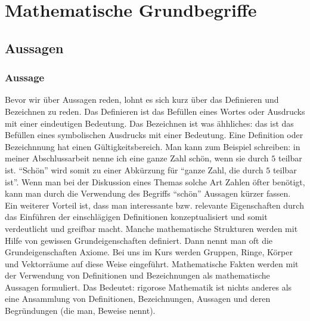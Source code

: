 \section{Mathematische Grundbegriffe}



\subsection{Aussagen}

\subsubsection{Aussage}

Bevor wir über Aussagen reden, lohnt es sich kurz über das Definieren und Bezeichnen zu reden. Das Definieren ist das Befüllen eines Wortes oder Ausdrucks mit einer eindeutigen Bedeutung. Das Bezeichnen ist was ähhliches: das ist das Befüllen eines symbolischen Ausdrucks mit einer Bedeutung. 
 Eine Definition oder Bezeichnnung hat einen Gültigkeitsbereich. Man kann zum Beispiel schreiben: in meiner Abschlussarbeit nenne ich eine ganze Zahl schön, wenn sie durch $5$ teilbar ist. ``Schön'' wird somit zu  einer Abkürzung für ``ganze Zahl, die durch $5$ teilbar ist''. Wenn man bei der Diskussion eines Themas solche Art Zahlen öfter benötigt, kann man durch die Verwendung des Begriffs ``schön'' Aussagen kürzer fassen. Ein weiterer Vorteil ist, dass man interessante bzw. relevante Eigenschaften durch das Einführen der einschlägigen Definitionen konzeptualisiert und somit verdeutlicht und greifbar macht. Manche mathematische Strukturen werden mit Hilfe von gewissen Grundeigenschaften definiert. Dann nennt man oft die Grundeigenschaften Axiome. Bei uns im Kurs werden Gruppen, Ringe, Körper und Vektorräume auf diese Weise eingeführt. Mathematische Fakten werden mit der Verwendung von Definitionen und Bezeichnungen als mathematische Aussagen formuliert. Das Bedeutet: rigorose Mathematik ist nichts anderes als eine Ansammlung von Definitionen, Bezeichnungen, Aussagen und deren Begründungen (die man, Beweise nennt). 


